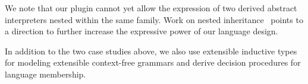 We note that our plugin cannot yet allow the expression of two derived abstract
interpreters nested within the same family.
Work on nested inheritance~\cite{ncm2004,zm2017} points to a direction
to further increase the expressive power of our language design.

In addition to the two case studies above, we also use extensible
inductive types for modeling extensible context-free grammars and derive
decision procedures for language membership.

